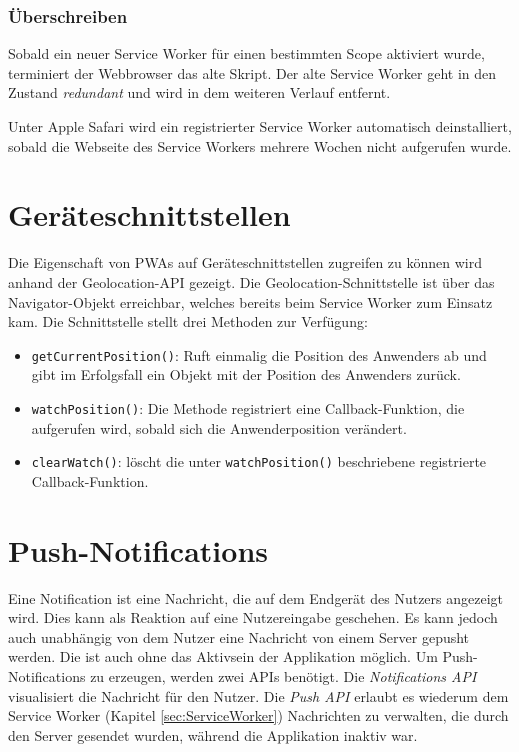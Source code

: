 \subsubsection{Überschreiben}

Sobald ein neuer Service Worker für einen bestimmten Scope aktiviert wurde, terminiert der Webbrowser das alte Skript. Der alte Service Worker geht in den Zustand \textit{redundant} und wird in dem weiteren Verlauf entfernt. 

Unter Apple Safari wird ein registrierter Service Worker automatisch deinstalliert, sobald die Webseite des Service Workers mehrere Wochen nicht aufgerufen wurde. 



\section{Geräteschnittstellen}\label{sec:Geraeteschnittstelle}

Die Eigenschaft von PWAs auf Geräteschnittstellen zugreifen zu können wird anhand der Geolocation-API gezeigt. 
Die Geolocation-Schnittstelle ist über das Navigator-Objekt erreichbar, welches bereits beim Service Worker zum Einsatz kam. Die Schnittstelle stellt drei Methoden zur Verfügung: 
\begin{itemize}
    \item \texttt{getCurrentPosition()}: Ruft einmalig die Position des Anwenders ab und gibt im Erfolgsfall ein Objekt mit der Position des Anwenders zurück. 
    \item \texttt{watchPosition()}: Die Methode registriert eine Callback-Funktion, die aufgerufen wird, sobald sich die Anwenderposition verändert. 
    \item \texttt{clearWatch()}: löscht die unter \texttt{watchPosition()} beschriebene registrierte Callback-Funktion. 
\end{itemize}

\section{Push-Notifications}\label{sec:ThPushNotifikations}

Eine Notification ist eine Nachricht, die auf dem Endgerät des Nutzers angezeigt wird. Dies kann als Reaktion auf eine Nutzereingabe geschehen. Es kann jedoch auch unabhängig von dem Nutzer eine Nachricht von einem Server \glqq gepusht\grqq{} werden. Die ist auch ohne das Aktivsein der Applikation möglich.  Um Push-Notifications zu erzeugen, werden zwei APIs benötigt. Die \textit{Notifications API} visualisiert die Nachricht für den Nutzer. Die \textit{Push API} erlaubt es wiederum dem Service Worker (Kapitel \ref{sec:ServiceWorker}) Nachrichten zu verwalten, die durch den Server gesendet wurden, während die Applikation inaktiv war. 

